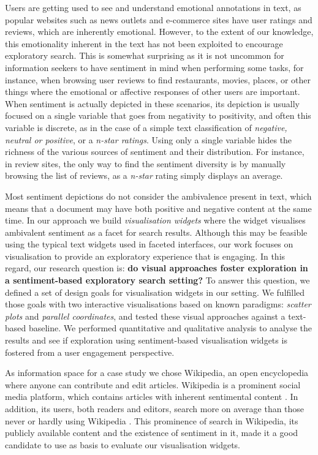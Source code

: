\documentclass{sig-alternate}
\begin{document}
Users are getting used to see and understand emotional annotations in text, as popular websites such as news outlets and e-commerce sites have user ratings and reviews, which are inherently emotional. 
However, to the extent of our knowledge, this emotionality inherent in the text has not been exploited to encourage exploratory search. 
This is somewhat surprising as it is not uncommon for information seekers to have sentiment in mind when performing some tasks, for instance, when browsing user reviews to find restaurants, movies, places, or other things where the  emotional or affective responses of other users are important.
When sentiment is actually depicted in these scenarios, its depiction is usually focused on a single variable that goes from negativity to positivity, and often this variable is discrete, as in the case of a simple text classification of \emph{negative, neutral or positive}, or a \emph{n-star ratings}. 
Using only a single variable hides the richness of the various sources of sentiment and their distribution. For instance, in review sites, the only way to find the sentiment diversity is by manually browsing the list of reviews, as a \emph{n-star} rating simply displays an average.

Most sentiment depictions do not consider the ambivalence present in text, which means that a document may have both positive and negative content at the same time. 
In our approach we build \emph{visualisation widgets} \cite{dork2008visgets} where the widget visualises ambivalent sentiment as a facet for search results. 
Although this may be feasible using the typical text widgets used in faceted interfaces, our work focuses on visualisation to provide an exploratory experience that is engaging. 
In this regard, our research question is: \textbf{do visual approaches foster exploration in a sentiment-based exploratory search setting?} 
To answer this question, we defined a set of design goals for visualisation widgets in our setting. 
We fulfilled those goals with two interactive visualisations based on known paradigms: \emph{scatter plots} and \emph{parallel coordinates}, and tested these visual approaches against a text-based baseline. 
We performed quantitative and qualitative analysis to analyse the results and see if  exploration using sentiment-based visualisation widgets is fostered from a user engagement perspective.

As information space for a case study we chose Wikipedia, an open encyclopedia where anyone can contribute and edit articles. 
Wikipedia is a prominent social media platform, which contains articles with inherent sentimental content \cite{mejova2013searching}. 
In addition, its users, both readers and editors, search more on average than those never or hardly using Wikipedia \cite{west2012data}. 
This prominence of search in Wikipedia, its publicly available content and the existence of sentiment in it, made it a good candidate to use as basis to evaluate our visualisation widgets.
\end{document}
